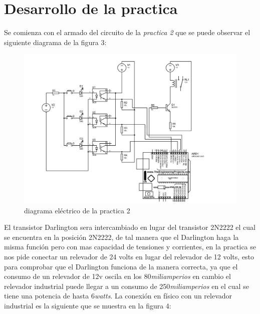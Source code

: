 \documentclass[11pt,a4paper]{article}
\begin{document}
\newpage

\section{Desarrollo de la practica}

Se comienza con el armado del circuito de la \emph{practica 2} que se puede observar el siguiente diagrama de la figura 3:

\begin{figure}[h]
\begin{center}
\includegraphics[scale=0.3]{2.jpeg}
\caption{diagrama eléctrico de la practica 2}
\end{center}
\end{figure}

El transistor Darlington sera intercambiado en lugar del transistor 2N2222 el cual se encuentra en la posición 2N2222, de tal manera que el Darlington haga la misma función pero con mas capacidad de tensiones y corrientes, en la practica se nos pide conectar un relevador de 24 volts en lugar del relevador de 12 volts, esto para comprobar que el Darlington funciona de la manera correcta, ya que el consumo de un relevador de 12v oscila en los 80\emph{miliamperios} en cambio el relevador industrial puede llegar a un consumo de 250\emph{miliamperios} en el cual se tiene una potencia de hasta 6\emph{watts}. La conexión en físico con un relevador industrial es la siguiente que se muestra en la figura 4:
\end{document}
